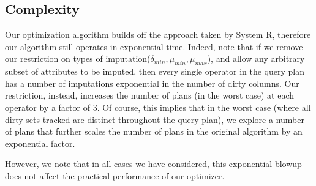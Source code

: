 
\subsection{Complexity}
Our optimization algorithm builds off the approach taken by System R\cite{blasgen1981system}, therefore our algorithm still operates in exponential time. Indeed, 
note that if we remove our restriction on types of imputation($\delta_{min}, \mu_{min}, \mu_{max}$), and allow any arbitrary subset of attributes to be imputed,
then every single operator in the query plan has a number of imputations exponential in the number of dirty columns. Our restriction, instead, increases the number
of plans (in the worst case) at each operator by a factor of 3. Of course, this implies that in the worst case (where all dirty sets tracked are distinct throughout the query plan),
we explore a number of plans that further scales the number of plans in the original algorithm by an exponential factor.

However, we note that in all cases we have considered, this exponential blowup does not affect the practical performance of our optimizer.

